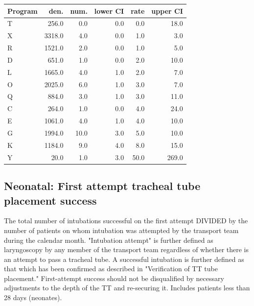 \documentclass[twoside]{article}\usepackage[]{graphicx}\usepackage[]{color}
\begin{document}
\begin{table}[ht]
\centering
\begin{tabular}{lrrrrr}
  \hline
Program & den. & num. & lower CI & rate & upper CI \\ 
  \hline
T & 256.0 & 0.0 & 0.0 & 0.0 & 18.0 \\ 
  X & 3318.0 & 4.0 & 0.0 & 1.0 & 3.0 \\ 
  R & 1521.0 & 2.0 & 0.0 & 1.0 & 5.0 \\ 
  D & 651.0 & 1.0 & 0.0 & 2.0 & 10.0 \\ 
  L & 1665.0 & 4.0 & 1.0 & 2.0 & 7.0 \\ 
  O & 2025.0 & 6.0 & 1.0 & 3.0 & 7.0 \\ 
  Q & 884.0 & 3.0 & 1.0 & 3.0 & 11.0 \\ 
  C & 264.0 & 1.0 & 0.0 & 4.0 & 24.0 \\ 
  E & 1061.0 & 4.0 & 1.0 & 4.0 & 10.0 \\ 
  G & 1994.0 & 10.0 & 3.0 & 5.0 & 10.0 \\ 
  K & 1184.0 & 9.0 & 4.0 & 8.0 & 15.0 \\ 
  Y & 20.0 & 1.0 & 3.0 & 50.0 & 269.0 \\ 
   \hline
\end{tabular}
\end{table}



\newpage
\subsection{Neonatal: First attempt tracheal tube placement success}
The total number of intubations successful on the first attempt DIVIDED by the number of patients on whom intubation was attempted by the transport team during the calendar month. "Intubation attempt" is further defined as laryngoscopy by any member of the transport team regardless of whether there is an attempt to pass a tracheal tube. A successful intubation is further defined as that which has been confirmed as described in "Verification of TT tube placement." First-attempt success should not be disqualified by necessary adjustments to the depth of the TT and re-securing it. Includes patients less than 28 days (neonates).
\end{document}
